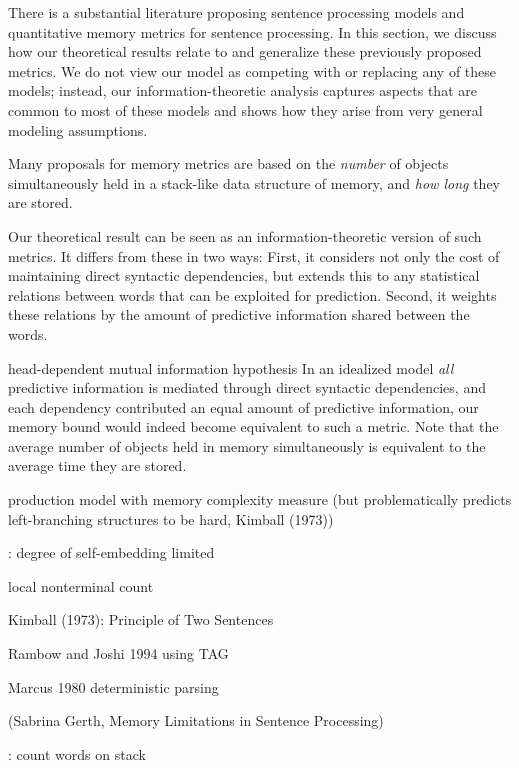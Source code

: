 There is a substantial literature proposing sentence processing models and quantitative memory metrics for sentence processing.
In this section, we discuss how our theoretical results relate to and generalize these previously proposed metrics.
We do not view our model as competing with or replacing any of these models; instead, our information-theoretic analysis captures aspects that are common to most of these models and shows how they arise from very general modeling assumptions.

Many proposals for memory metrics are based on the \emph{number} of objects simultaneously held in a stack-like data structure of memory, and \emph{how long} they are stored.

Our theoretical result can be seen as an information-theoretic version of such metrics.
It differs from these in two ways:
First, it considers not only the cost of maintaining direct syntactic dependencies, but extends this to any statistical relations between words that can be exploited for prediction.
Second, it weights these relations by the amount of predictive information shared between the words.

head-dependent mutual information hypothesis
In an idealized model \emph{all} predictive information is mediated through direct syntactic dependencies, and each dependency contributed an equal amount of predictive information, our memory bound would indeed become equivalent to such a metric.
Note that the average number of objects held in memory simultaneously is equivalent to the average time they are stored.



\cite{yngve1960model} production model with memory complexity measure (but problematically predicts left-branching structures to be hard, Kimball (1973))

\cite{miller-finitary-1963}: degree of self-embedding limited

\cite{frazier1985syntactic} local nonterminal count

Kimball (1973): Principle of Two Sentences

Rambow and Joshi 1994 using TAG

Marcus 1980 deterministic parsing

(Sabrina Gerth, Memory Limitations in Sentence Processing)

\cite{gerth2009unifying}


\cite{wanner1978atn}
\cite{frazier1978sausage}

\cite{rambow201512}: count words on stack

